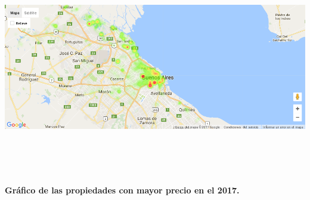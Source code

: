 \documentclass[a4paper, 10pt]{article}
\begin{document}
        		\begin{center}
              	\includegraphics[width=7in, height=4in]{images/ubicP2017}
             	\textbf{Gráfico de las propiedades con mayor precio en el 2017.}
       		\end{center}
\end{document}
